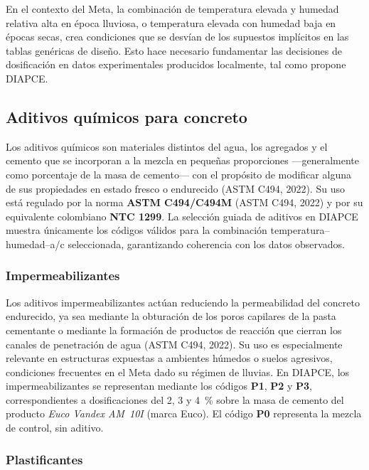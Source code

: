 En el contexto del Meta, la combinación de temperatura elevada y humedad relativa alta en época lluviosa, o temperatura elevada con humedad baja en épocas secas, crea condiciones que se desvían de los supuestos implícitos en las tablas genéricas de diseño. Esto hace necesario fundamentar las decisiones de dosificación en datos experimentales producidos localmente, tal como propone DIAPCE.

\subsection{Aditivos químicos para concreto}

Los aditivos químicos son materiales distintos del agua, los agregados y el cemento que se incorporan a la mezcla en pequeñas proporciones —generalmente como porcentaje de la masa de cemento— con el propósito de modificar alguna de sus propiedades en estado fresco o endurecido (ASTM C494, 2022). Su uso está regulado por la norma \textbf{ASTM C494/C494M} (ASTM C494, 2022) y por su equivalente colombiano \textbf{NTC 1299}. La selección guiada de aditivos en DIAPCE muestra únicamente los códigos válidos para la combinación temperatura–humedad–a/c seleccionada, garantizando coherencia con los datos observados.

\subsubsection*{Impermeabilizantes}

Los aditivos impermeabilizantes actúan reduciendo la permeabilidad del concreto endurecido, ya sea mediante la obturación de los poros capilares de la pasta cementante o mediante la formación de productos de reacción que cierran los canales de penetración de agua (ASTM C494, 2022). Su uso es especialmente relevante en estructuras expuestas a ambientes húmedos o suelos agresivos, condiciones frecuentes en el Meta dado su régimen de lluvias. En DIAPCE, los impermeabilizantes se representan mediante los códigos \textbf{P1}, \textbf{P2} y \textbf{P3}, correspondientes a dosificaciones del 2, 3 y 4~\% sobre la masa de cemento del producto \textit{Euco Vandex AM~10I} (marca Euco). El código \textbf{P0} representa la mezcla de control, sin aditivo.

\subsubsection*{Plastificantes}

